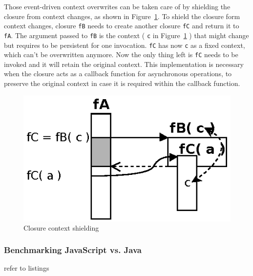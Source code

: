 Those event-driven context overwrites can be taken care of by shielding the closure from context changes, as shown in Figure~\ref{fig:Closures_Closure-3}.
To shield the closure form context changes, closure \texttt{fB} needs to create another closure \texttt{fC} and return it to \texttt{fA}.
The argument passed to \texttt{fB} is the context ( \texttt{c} in Figure~\ref{fig:Closures_Closure-3} ) that might change but requires to be persistent for one invocation.
\texttt{fC} has now \texttt{c} as a fixed context, which can't be overwritten anymore.
Now the only thing left is \texttt{fC} needs to be invoked and it will retain the original context.
This implementation is necessary when the closure acts as a callback function for asynchronous operations, to preserve the original context in case it is required within the callback function.
\begin{figure}[!ht]
	\centering
  \includegraphics{figures/Closures_Closure-3}
	\caption{Closure context shielding}
	\label{fig:Closures_Closure-3}
\end{figure}



\subsubsection{Benchmarking JavaScript vs. Java}
refer to listings



